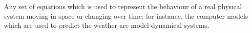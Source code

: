 Any set of equations which is used to represent the behaviour of a real physical
system moving in space or changing over time; for instance, the computer models
which are used to predict the weather are model dynamical systems.